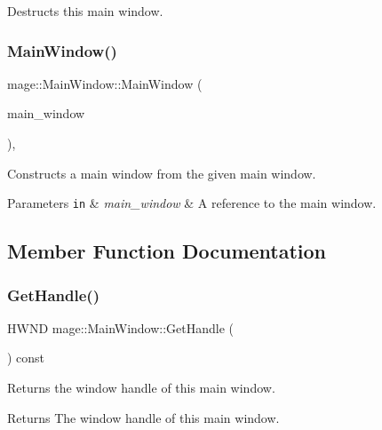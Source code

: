 Destructs this main window. \hypertarget{classmage_1_1_main_window_a8dc3c590bb168f8178a7db72ff60fd0c}{}\label{classmage_1_1_main_window_a8dc3c590bb168f8178a7db72ff60fd0c} 
\subsubsection{\texorpdfstring{Main\+Window()}{MainWindow()}\hspace{0.1cm}{\footnotesize\ttfamily [2/2]}}
{\footnotesize\ttfamily mage\+::\+Main\+Window\+::\+Main\+Window (\begin{DoxyParamCaption}\item[{const \hyperlink{classmage_1_1_main_window}{Main\+Window} \&}]{main\+\_\+window }\end{DoxyParamCaption})\hspace{0.3cm}{\ttfamily [private]}, {\ttfamily [delete]}}

Constructs a main window from the given main window.


\begin{DoxyParams}[1]{Parameters}
\mbox{\tt in}  & {\em main\+\_\+window} & A reference to the main window. \\
\hline
\end{DoxyParams}


\subsection{Member Function Documentation}
\hypertarget{classmage_1_1_main_window_acfaa88503f2c5e4a05aa9fa9698d2735}{}\label{classmage_1_1_main_window_acfaa88503f2c5e4a05aa9fa9698d2735} 
\subsubsection{\texorpdfstring{Get\+Handle()}{GetHandle()}}
{\footnotesize\ttfamily H\+W\+ND mage\+::\+Main\+Window\+::\+Get\+Handle (\begin{DoxyParamCaption}{ }\end{DoxyParamCaption}) const}

Returns the window handle of this main window.

\begin{DoxyReturn}{Returns}
The window handle of this main window. 
\end{DoxyReturn}
\hypertarget{classmage_1_1_main_window_ae26a7e1e96bc5522461aed6156138a0c}{}\label{classmage_1_1_main_window_ae26a7e1e96bc5522461aed6156138a0c} 
